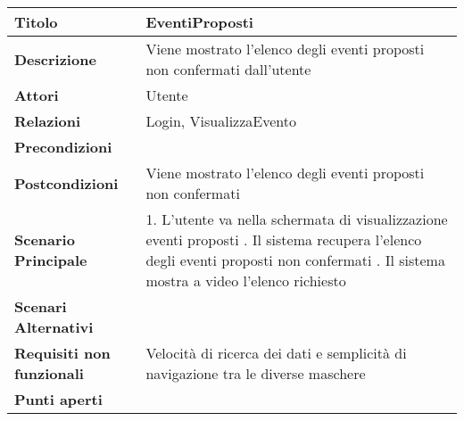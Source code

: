 \begin{tabular} {|P{4.5cm}|P{12.5cm}|}
  \hline
  \textbf{Titolo}                   & EventiProposti                                                           \\
  \hline
  \textbf{Descrizione}              & Viene mostrato l'elenco degli eventi proposti non confermati dall'utente \\
  \hline
  \textbf{Attori}                   & Utente                                                                   \\
  \hline
  \textbf{Relazioni}                & Login, VisualizzaEvento                                                  \\
  \hline
  \textbf{Precondizioni}            &                                                                          \\
  \hline
  \textbf{Postcondizioni}           & Viene mostrato l'elenco degli eventi proposti non confermati             \\
  \hline
  \textbf{Scenario Principale}      & 1. L'utente va nella schermata di
  visualizzazione eventi proposti . Il sistema recupera l'elenco degli eventi proposti non confermati . Il sistema mostra a video
  l'elenco richiesto                                                                                           \\
  \hline
  \textbf{Scenari Alternativi}      &                                                                          \\
  \hline
  \textbf{Requisiti non funzionali} & Velocità di ricerca dei dati e
  semplicità di navigazione tra le diverse maschere                                                            \\
  \hline
  \textbf{Punti aperti}             &                                                                          \\
  \hline
\end{tabular}
\hfill
\break

